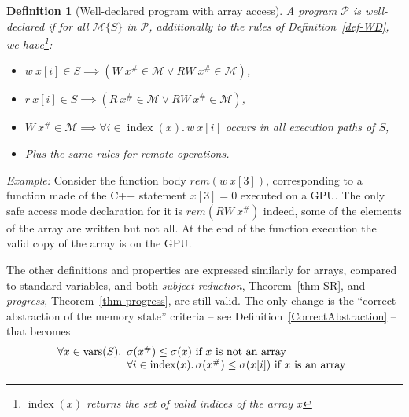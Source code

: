 \documentclass[preprint,12pt]{elsarticle}
\newcommand{\symb}[1]{\textit{#1}}
\DeclareMathOperator{\vars}{vars}
\newcommand{\rem}[1]{\symb{rem}(#1)}
\newtheorem{definition}{Definition}
\newcommand{\abs}[1]{#1^\#}
\newcommand{\AM}{\mathcal{M}}
\newcommand{\Prog}{\mathcal{P}}
\DeclareMathOperator{\range}{index}
\newenvironment{example}{\smallskip\par\noindent\emph{Example:}}{\medskip}
\begin{document}
\begin{definition}[Well-declared program with array access]\label{def:well-declared-array}
A program $\Prog$ is \emph{well-declared} if for all $\AM\{S\}$ in $\Prog$, additionally 
to the rules of Definition~\ref{def-WD}, we have\footnote{$\range(x)$ returns the set of valid indices of the array $x$}:
\begin{itemize}
\item $w\ x[i]\in S \implies (W\ \abs x \in \AM \lor RW\ \abs x \in \AM)$,
\item $r\ x[i]\in S \implies (R\ \abs x \in \AM \lor RW\ \abs x \in \AM)$,
\item $W\ \abs x\!\in\! \AM \!\implies\! \forall i\!\!\in\!\!\range(x).\, w\ x[i]$ occurs in all execution 
paths of $S$,
\item Plus the same rules for remote operations.
\end{itemize}
\end{definition}

\begin{example}
Consider the function body $\rem {w~x[3]}$, corresponding to a function made of the C++ statement $x[3]=0$ executed on a GPU. The only safe access mode declaration for it is $\rem{RW~\abs x}$ indeed, some of the elements of the array are written but not all. At the end of the function execution the valid copy of the array is on the GPU.
\end{example}

The other definitions and properties are expressed similarly for arrays, compared to standard variables, and both \emph{subject-reduction}, 
Theorem~\ref{thm-SR}, and \emph{progress}, Theorem~\ref{thm-progress}, are 
still valid. The only change is the ``correct abstraction of the memory state'' criteria -- see Definition~\ref{CorrectAbstraction} --  
that becomes 
\[\forall x\in 
\vars(S).\begin{array}[t]{l}
\sigma(\abs x)\leq\sigma(x) \text{ if $x$ is not an array} \\
	\forall i\in\range(x).\, \sigma(\abs x)\leq\sigma(x[i]) \text{ if $x$ is an array}
\end{array}
\]
\end{document}
